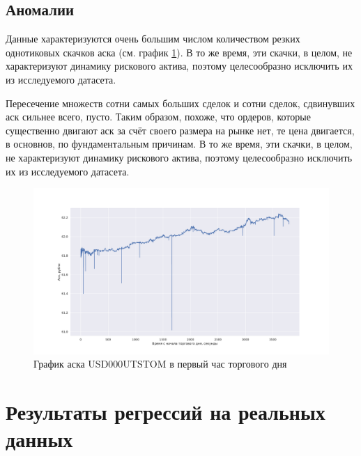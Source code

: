 


\subsection{Аномалии}

Данные характеризуются очень большим числом количеством резких однотиковых скачков аска (см. график \ref{askgraph}). 
В то же время, эти скачки, в целом, не характеризуют
динамику рискового актива, поэтому целесообразно исключить их из исследуемого датасета. \par
Пересечение множеств
сотни самых больших сделок и сотни сделок, сдвинувших аск сильнее всего, пусто. Таким образом, похоже, что ордеров,
которые существенно двигают аск за счёт своего размера на рынке нет, те цена двигается, в основнов, по фундаментальным причинам.
В то же время, эти скачки, в целом, не характеризуют
динамику рискового актива, поэтому целесообразно исключить их из исследуемого датасета.
\begin{figure}
    \includegraphics[scale=0.41]{fig/Palki.pdf}
    \caption{График аска USD000UTSTOM в первый час торгового дня}
    \label{askgraph}
\end{figure}


\section{Результаты регрессий на реальных данных}

